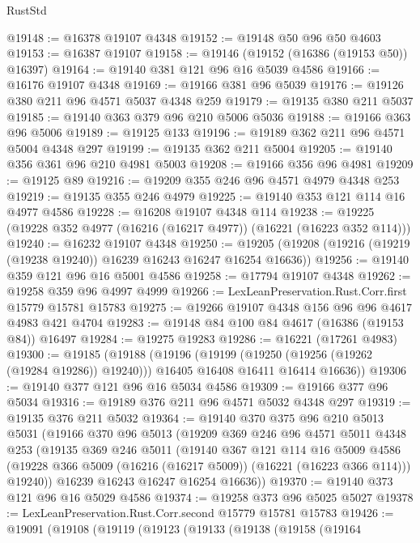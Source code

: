 \begin{lexlean}{RustStd}
\begin{coremodule}
@19148 := @16378 @19107 @4348
@19152 := @19148 @50 @96 @50 @4603
@19153 := @16387 @19107
@19158 := @19146 (@19152 (@16386 (@19153 @50)) @16397)
@19164 := @19140 @381 @121 @96 @16 @5039 @4586
@19166 := @16176 @19107 @4348
@19169 := @19166 @381 @96 @5039
@19176 := @19126 @380 @211 @96 @4571 @5037 @4348 @259
@19179 := @19135 @380 @211 @5037
@19185 := @19140 @363 @379 @96 @210 @5006 @5036
@19188 := @19166 @363 @96 @5006
@19189 := @19125 @133
@19196 := @19189 @362 @211 @96 @4571 @5004 @4348 @297
@19199 := @19135 @362 @211 @5004
@19205 := @19140 @356 @361 @96 @210 @4981 @5003
@19208 := @19166 @356 @96 @4981
@19209 := @19125 @89
@19216 := @19209 @355 @246 @96 @4571 @4979 @4348 @253
@19219 := @19135 @355 @246 @4979
@19225 := @19140 @353 @121 @114 @16 @4977 @4586
@19228 := @16208 @19107 @4348 @114
@19238 := @19225 (@19228 @352 @4977 (@16216 (@16217 @4977)) (@16221 (@16223 @352 @114)))
@19240 := @16232 @19107 @4348
@19250 := @19205 (@19208 (@19216 (@19219 (@19238 @19240)) @16239 @16243 @16247 @16254 @16636))
@19256 := @19140 @359 @121 @96 @16 @5001 @4586
@19258 := @17794 @19107 @4348
@19262 := @19258 @359 @96 @4997 @4999
@19266 := LexLeanPreservation.Rust.Corr.first @15779 @15781 @15783
@19275 := @19266 @19107 @4348 @156 @96 @96 @4617 @4983 @421 @4704
@19283 := @19148 @84 @100 @84 @4617 (@16386 (@19153 @84)) @16497
@19284 := @19275 @19283
@19286 := @16221 (@17261 @4983)
@19300 := @19185
    (@19188
      (@19196
        (@19199 (@19250 (@19256 (@19262 (@19284 @19286)) @19240)))
        @16405
        @16408
        @16411
        @16414
        @16636))
@19306 := @19140 @377 @121 @96 @16 @5034 @4586
@19309 := @19166 @377 @96 @5034
@19316 := @19189 @376 @211 @96 @4571 @5032 @4348 @297
@19319 := @19135 @376 @211 @5032
@19364 := @19140
    @370
    @375
    @96
    @210
    @5013
    @5031
    (@19166
      @370
      @96
      @5013
      (@19209
        @369
        @246
        @96
        @4571
        @5011
        @4348
        @253
        (@19135
          @369
          @246
          @5011
          (@19140
            @367
            @121
            @114
            @16
            @5009
            @4586
            (@19228 @366 @5009 (@16216 (@16217 @5009)) (@16221 (@16223 @366 @114)))
            @19240))
        @16239
        @16243
        @16247
        @16254
        @16636))
@19370 := @19140 @373 @121 @96 @16 @5029 @4586
@19374 := @19258 @373 @96 @5025 @5027
@19378 := LexLeanPreservation.Rust.Corr.second @15779 @15781 @15783
@19426 := @19091
    (@19108
      (@19119
        (@19123
          (@19133
            (@19138
              (@19158
                (@19164

\end{coremodule}
\end{lexlean}
